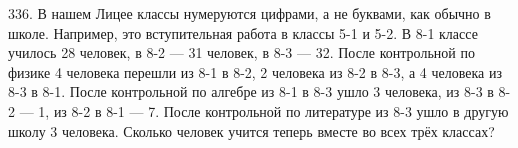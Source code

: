 336. В нашем Лицее классы нумеруются цифрами, а не буквами, как обычно в школе. Например, это вступительная работа в классы 5-1 и 5-2. В 8-1 классе училось 28 человек, в 8-2 --- 31 человек, в 8-3 --- 32. После контрольной по физике 4 человека перешли из 8-1 в 8-2, 2 человека из 8-2 в 8-3, а 4 человека из 8-3 в 8-1. После контрольной по алгебре из 8-1 в 8-3 ушло 3 человека, из 8-3 в 8-2 --- 1, из 8-2 в 8-1 --- 7. После контрольной по литературе из 8-3 ушло в другую школу 3 человека. Сколько человек учится теперь вместе во всех трёх классах?\\
